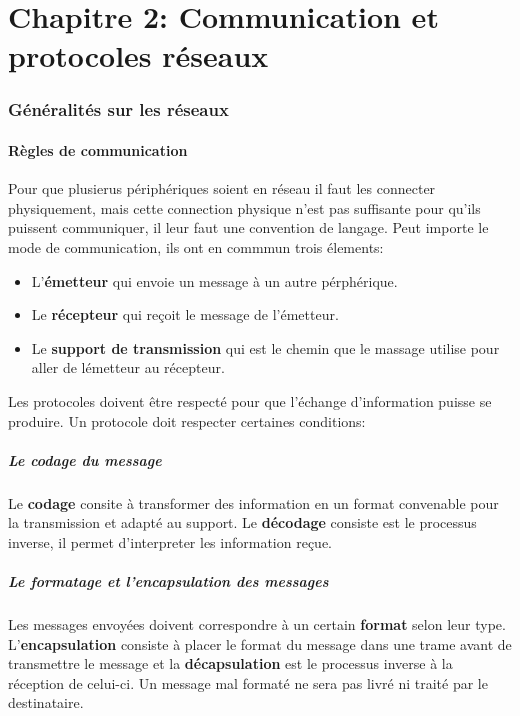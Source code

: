  \part{Chapitre 2: Communication et protocoles réseaux}
 \section{Généralités sur les réseaux}
 \subsection{Règles de communication}
 Pour que plusierus périphériques soient en réseau il faut les connecter physiquement, mais cette connection physique n'est pas suffisante pour qu'ils puissent communiquer, il leur faut une convention de langage. Peut importe le mode de communication, ils ont en commmun trois élements:
 \begin{itemize}
	 \item L'\textbf{émetteur} qui envoie un message à un autre pérphérique.
	 \item Le \textbf{récepteur} qui reçoit le message de l'émetteur.
	 \item Le \textbf{support de transmission} qui est le chemin que le massage utilise pour aller de lémetteur au récepteur.
 \end{itemize}
 Les protocoles doivent être respecté pour que l'échange d'information puisse se produire. Un protocole doit respecter certaines conditions:
 \subsubsection{Le codage du message}
 Le \textbf{codage} consite à transformer des information en un format convenable pour la transmission et adapté au support.
 \indent
 Le \textbf{décodage} consiste est le processus inverse, il permet d'interpreter les information reçue.

 \subsubsection{Le formatage et l'encapsulation des messages}
 Les messages envoyées doivent correspondre à un certain \textbf{format} selon leur type. L'\textbf{encapsulation} consiste à placer le format du message dans une trame avant de transmettre le message et la \textbf{décapsulation} est le processus inverse à la réception de celui-ci. Un message mal formaté ne sera pas livré ni traité par le destinataire.

